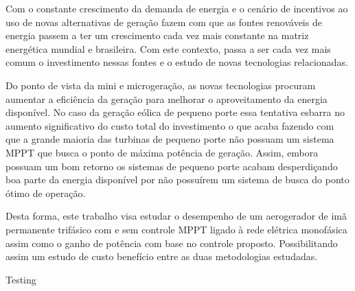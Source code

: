 Com o constante crescimento da demanda de energia e o cenário de incentivos ao uso de novas alternativas de geração fazem com que as fontes renováveis de energia passem a ter um crescimento cada vez mais constante na matriz energética mundial e brasileira. Com este contexto, passa a ser cada vez mais comum o investimento nessas fontes e o estudo de novas tecnologias relacionadas.

Do ponto de vista da mini e microgeração, as novas tecnologias procuram aumentar a eficiência da geração para melhorar o aproveitamento da energia disponível. No caso da geração eólica de pequeno porte essa tentativa esbarra no aumento significativo do custo total do investimento o que acaba fazendo com que a grande maioria das turbinas de pequeno porte não possuam um sistema MPPT que busca o ponto de máxima potência de geração. Assim, embora possuam um bom retorno os sistemas de pequeno porte acabam desperdiçando boa parte da energia disponível por não possuírem um sistema de busca do ponto ótimo de operação.

Desta forma, este trabalho visa estudar o desempenho de um aerogerador de imã permanente trifásico com e sem controle MPPT ligado à rede elétrica monofásica assim como o ganho de potência com base no controle proposto. Possibilitando assim um estudo de custo benefício entre as duas metodologias estudadas.


Testing
